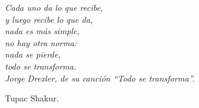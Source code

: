 
%
%
%

\thispagestyle{empty}
\vspace*{3.5cm}
\begin{flushright}

\emph{Cada uno da lo que recibe,\\y luego recibe lo que da,\\nada es m{\'a}s simple,\\no hay otra norma:\\nada se pierde,\\todo se transforma.}\\
\vspace*{0.5cm} \emph{Jorge Drexler, de su canci{\'o}n ``Todo se
transforma''.}

\vfill

\tiny{Tupac Shakur.}


\end{flushright}
